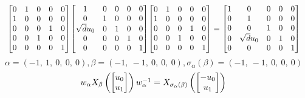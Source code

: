 \documentclass[11pt]{article}
\theoremstyle{definition}
\begin{document}
\[
\scaletoalign{\textwidth}{{\left[\begin{matrix}0 & 1 & 0 & 0 & 0\\1 & 0 & 0 & 0 & 0\\0 & 0 & 0 & 1 & 0\\0 & 0 & 1 & 0 & 0\\0 & 0 & 0 & 0 & 1\end{matrix}\right]} {\left[\begin{matrix}1 & 0 & 0 & 0 & 0\\0 & 1 & 0 & 0 & 0\\\sqrt{d} u_{0} & 0 & 1 & 0 & 0\\0 & 0 & 0 & 1 & 0\\0 & 0 & 0 & 0 & 1\end{matrix}\right]} {\left[\begin{matrix}0 & 1 & 0 & 0 & 0\\1 & 0 & 0 & 0 & 0\\0 & 0 & 0 & 1 & 0\\0 & 0 & 1 & 0 & 0\\0 & 0 & 0 & 0 & 1\end{matrix}\right]} = {\left[\begin{matrix}1 & 0 & 0 & 0 & 0\\0 & 1 & 0 & 0 & 0\\0 & 0 & 1 & 0 & 0\\0 & \sqrt{d} u_{0} & 0 & 1 & 0\\0 & 0 & 0 & 0 & 1\end{matrix}\right]}}
\]
\[
\alpha = \left( -1, \  1, \  0, \  0, \  0\right), \beta = \left( -1, \  -1, \  0, \  0, \  0\right), \sigma_{\alpha}(\beta) = \left( -1, \  -1, \  0, \  0, \  0\right)
\]
\[
\scaletoalign{\textwidth}{w_{\alpha} X_{\beta}\left(\left[\begin{matrix}u_{0}\\u_{1}\end{matrix}\right]\right) w_{\alpha}^{-1} = X_{\sigma_{\alpha}\left(\beta\right)}\left(\left[\begin{matrix}- u_{0}\\u_{1}\end{matrix}\right]\right)}
\]
\end{document}
